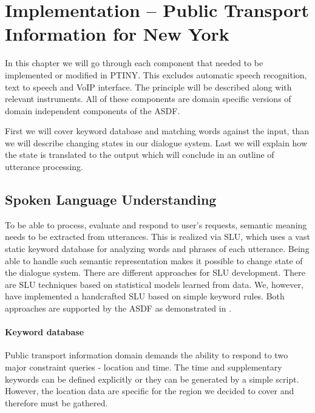 \chapter{Implementation -- Public Transport Information for New York}

In this chapter we will go through each component that needed to be implemented or modified in \ac{PTINY}.
This excludes automatic speech recognition, text to speech and VoIP interface.
The principle will be described along with relevant instruments. %
All of these components are domain specific versions of domain independent components of the \ac{ASDF}.

First we will cover keyword database and matching words against the input, than we will describe changing states in our dialogue system.
Last we will explain how the state is translated to the output which will conclude in an outline of utterance processing. %

\section{Spoken Language Understanding}

To be able to process, evaluate and respond to user's requests, semantic meaning needs to be extracted from utterances. %
This is realized via \acf{SLU}, which uses a vast static keyword database for analyzing words and phrases of each utterance.
Being able to handle such semantic representation makes it possible to change state of the dialogue system.
There are different approaches for \ac{SLU} development.
There are \ac{SLU} techniques based on statistical models learned from data.
We, however, have implemented a handcrafted \ac{SLU} based on simple keyword rules.
Both approaches are supported by the \ac{ASDF} as demonstrated in \cite{slu}.


\subsubsection{Keyword database} 

Public transport information domain demands the ability to respond to two major constraint queries - location and time.
The time and supplementary keywords can be defined explicitly or they can be generated by a simple script.
However, the location data are specific for the region we decided to cover and therefore must be gathered.

